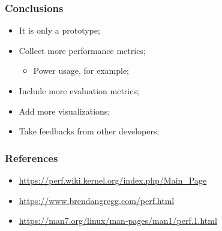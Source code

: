 \documentclass[aspectratio=169]{beamer}
\begin{document}
\begin{frame}
	\frametitle{Conclusions}

    \begin{itemize}
        \item It is only a prototype;
        \item Collect more performance metrics;
            \begin{itemize}
                \item Power usage, for example;
            \end{itemize}
        \item Include more evaluation metrics;
        \item Add more visualizations;
        \item Take feedbacks from other developers;
    \end{itemize}
\end{frame}

\begin{frame}
	\frametitle{References}

    \begin{itemize}
        \item \url{https://perf.wiki.kernel.org/index.php/Main_Page}
        \item \url{https://www.brendangregg.com/perf.html}
        \item \url{https://man7.org/linux/man-pages/man1/perf.1.html}
    \end{itemize}
\end{frame}
\end{document}

